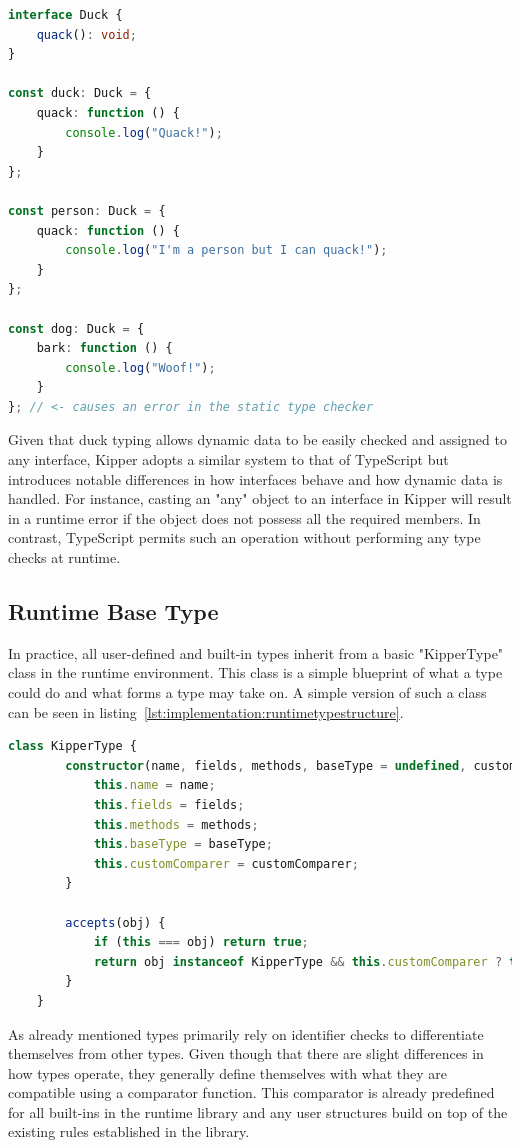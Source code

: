 \begin{lstlisting}[language=Typescript,caption=Example of duck typing in TypeScript,label=lst:implementation:javascriptducktyping]
interface Duck {
	quack(): void;
}

const duck: Duck = {
	quack: function () {
		console.log("Quack!");
	}
};

const person: Duck = {
	quack: function () {
		console.log("I'm a person but I can quack!");
	}
};

const dog: Duck = {
	bark: function () {
		console.log("Woof!");
	}
}; // <- causes an error in the static type checker
\end{lstlisting}

Given that duck typing allows dynamic data to be easily checked and assigned to any interface, Kipper adopts a similar system to that of TypeScript but introduces notable differences in how interfaces behave and how dynamic data is handled. For instance, casting an "any" object to an interface in Kipper will result in a runtime error if the object does not possess all the required members. In contrast, TypeScript permits such an operation without performing any type checks at runtime.

\subsection{Runtime Base Type}
\label{subsec:basetype}

In practice, all user-defined and built-in types inherit from a basic "KipperType" class in the runtime environment. This class is a simple blueprint of what a type could do and what forms a type may take on. A simple version of such a class can be seen in listing~\ref{lst:implementation:runtimetypestructure}.

\begin{lstlisting}[language=TypeScript,caption=The structure of a runtime type,label=lst:implementation:runtimetypestructure]
	class KipperType {
		constructor(name, fields, methods, baseType = undefined, customComparer = undefined) {
			this.name = name;
			this.fields = fields;
			this.methods = methods;
			this.baseType = baseType;
			this.customComparer = customComparer;
		}

		accepts(obj) {
			if (this === obj) return true;
			return obj instanceof KipperType && this.customComparer ? this.customComparer(this, obj) : false;
		}
	}
\end{lstlisting}

As already mentioned types primarily rely on identifier checks to differentiate themselves from other types. Given though that there are slight differences in how types operate, they generally define themselves with what they are compatible using a comparator function. This comparator is already predefined for all built-ins in the runtime library and any user structures build on top of the existing rules established in the library.

